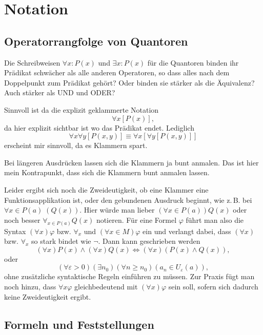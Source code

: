 \documentclass[a4paper,11pt,fleqn,twoside,BCOR=16mm]{scrartcl}
\begin{document}
\section{Notation}
\subsection{Operatorrangfolge von Quantoren}
Die Schreibweisen $\forall x\colon P(x)$ und $\exists x\colon P(x)$
für die Quantoren binden ihr Prädikat schwächer als alle anderen
Operatoren, so dass alles nach dem Doppelpunkt zum Prädikat gehört?
Oder binden sie stärker als die Äquivalenz? Auch stärker als UND und
ODER?

Sinnvoll ist da die explizit geklammerte Notation
\begin{equation}
\forall x[P(x)],
\end{equation}
da hier explizit sichtbar ist wo das Prädikat endet. Lediglich
\begin{equation}
\forall x\forall y [P(x,y)] \equiv \forall x[\forall y[P(x,y)]]
\end{equation}
erscheint mir sinnvoll, da es Klammern spart.

Bei längeren Ausdrücken lassen sich die Klammern ja bunt anmalen.
Das ist hier mein Kontrapunkt, dass sich die Klammern bunt
anmalen lassen.

Leider ergibt sich noch die Zweideutigkeit, ob eine Klammer eine
Funktionsapplikation ist, oder den gebundenen Ausdruck beginnt,
wie z.\,B. bei $\forall x{\in}P(a)\;(Q(x))$. Hier würde man lieber
$(\forall x{\in}P(a))Q(x)$ oder noch besser $\forall_{x\in P(a)} Q(x)$
notieren. Für eine Formel $\varphi$
führt man also die Syntax $(\forall x)\varphi$ bzw. $\forall_x$ und
$(\forall x{\in}M)\varphi$ ein und verlangt dabei, dass $(\forall x)$
bzw. $\forall_x$ so stark bindet wie $\neg$. Dann kann geschrieben werden
\begin{equation}
(\forall x)P(x)\land (\forall x)Q(x) \iff (\forall x)(P(x)\land Q(x)),
\end{equation}
oder
\begin{equation}
(\forall\varepsilon{>}0)(\exists n_0)(\forall n{\ge}n_0)(a_n\in U_\varepsilon(a)),
\end{equation}
ohne zusätzliche syntaktische Regeln einführen zu müssen.
Zur Praxis fügt man noch hinzu, dass $\forall x\varphi$ gleichbedeutend
mit $(\forall x)\varphi$ sein soll, sofern sich dadurch keine
Zweideutigkeit ergibt.

\subsection{Formeln und Feststellungen}
\end{document}
